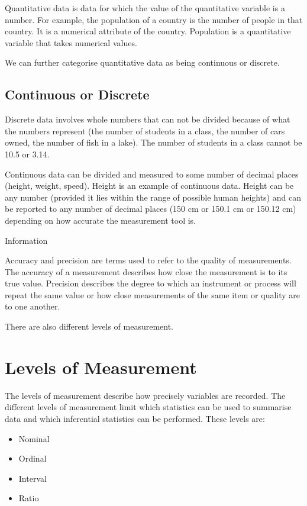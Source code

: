 \documentclass[
]{book}
\begin{document}
Quantitative data is data for which the value of the quantitative variable is a number. For example, the population of a country is the number of people in that country. It is a numerical attribute of the country. Population is a quantitative variable that takes numerical values.

We can further categorise quantitative data as being continuous or discrete.

\hypertarget{continuous-or-discrete}{%
\subsection{Continuous or Discrete}\label{continuous-or-discrete}}

Discrete data involves whole numbers that can not be divided because of what the numbers represent (the number of students in a class, the number of cars owned, the number of fish in a lake). The number of students in a class cannot be 10.5 or 3.14.

Continuous data can be divided and measured to some number of decimal places (height, weight, speed). Height is an example of continuous data. Height can be any number (provided it lies within the range of possible human heights) and can be reported to any number of decimal places (150 cm or 150.1 cm or 150.12 cm) depending on how accurate the measurement tool is.

Information

Accuracy and precision are terms used to refer to the quality of measurements. The accuracy of a measurement describes how close the measurement is to its true value. Precision describes the degree to which an instrument or process will repeat the same value or how close measurements of the same item or quality are to one another.

There are also different levels of measurement.

\hypertarget{levels-of-measurement}{%
\section{Levels of Measurement}\label{levels-of-measurement}}

The levels of measurement describe how precisely variables are recorded. The different levels of measurement limit which statistics can be used to summarise data and which inferential statistics can be performed. These levels are:

\begin{itemize}
\item
  Nominal
\item
  Ordinal
\item
  Interval
\item
  Ratio
\end{itemize}
\end{document}

